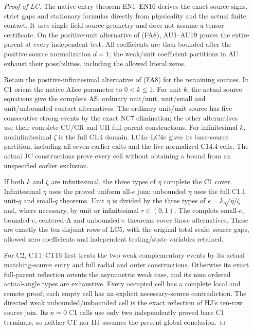 \begin{proof}[Proof of LC]
The native-entry theorem EN1--EN16 derives the exact source signs,
strict gaps and stationary formulas directly from physicality and the
actual finite contact.  It uses single-field source geometry and does
not assume a tensor certificate.  On the positive-unit alternative of
(FA8), AU1--AU19 proves the entire parent at every independent test.
All coefficients are then bounded after the positive source normalization
$d=1$; the weak/unit coefficient partitions in AU exhaust their
possibilities, including the allowed literal zeros.

Retain the positive-infinitesimal alternative of (FA8) for the remaining
sources.  In C1 orient the native Alice parameter to $0<k\leq1$.
For unit $k$, the actual source equations give the complete AS,
ordinary unit/unit, unit/small and unit/unbounded contact alternatives.
The ordinary unit/unit source has five consecutive strong events by
the exact NC7 elimination; the other alternatives use their complete
CU/CR and UH full-parent constructions.  For infinitesimal $k$,
noninfinitesimal $\zeta$ is the full C1.4 domain.  LC4a--LC4c gives its
bare-source partition, including all seven earlier exits and the five
normalized C14.4 cells.  The actual JC constructions prove every cell
without obtaining a bound from an unspecified earlier exclusion.

If both $k$ and $\zeta$ are infinitesimal, the three types of $\eta$
complete the C1 cover.  Infinitesimal $\eta$ uses the proved uniform
all-$e$ join; unbounded $\eta$ uses the full C1.1 unit-$q$ and small-$q$
theorems.  Unit $\eta$ is divided by the three types of
$e=k\sqrt{\eta/\zeta}$ and, where necessary, by unit or infinitesimal
$r\in(0,1)$.  The complete small-$e$, bounded-$e$, centered-A and
unbounded-$e$ theorems cover those alternatives.  These are exactly the
ten disjoint rows of LC5, with the original total scale, source gaps,
allowed zero coefficients and independent testing/state variables retained.

For C2, CT1--CT16 first treats the two weak complementary events by its
actual matching-source entry and full radial and outer constructions.
Otherwise its exact full-parent reflection orients the asymmetric weak
case, and its nine ordered actual-angle types are exhaustive.  Every
occupied cell has a complete local and remote proof; each empty cell
has an explicit necessary-source contradiction.  The directed weak
unbounded/unbounded cell is the exact reflection of HJ's ten-row source
join.  Its $n=0$ C1 calls use only two independently proved bare C1
terminals, so neither CT nor HJ assumes the present global conclusion.


\end{proof}
